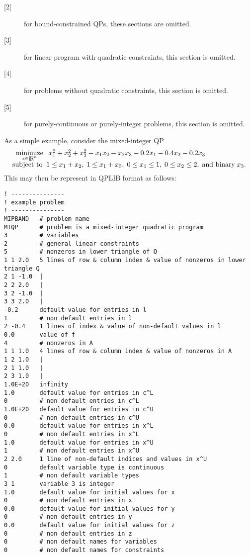 \begin{description}
\item [{[2]}]
for bound-constrained QPs, these sections are omitted.
\item [{[3]}]
for linear program with quadratic constraints, this section is omitted.
\item [{[4]}]
for problems without quadratic constraints, this section is omitted.
\item [{[5]}]
for purely-continuous or purely-integer problems, this section is omitted.
\end{description}

As a simple example, consider the mixed-integer QP
\[\arr{l}{\mininx{} x_1^2 + x_2^2 + x_3^2 - x_1 x_2 - x_2 x_3
  - 0.2 x_1  -0.4 x_2 - 0.2 x_3 \\
\st 1 \leq x_1 + x_2, \; 1 \leq x_1 + x_3, \; 0 \leq x_1 \leq 1,
\; 0 \leq x_2 \leq 2, \; \mbox{and binary} \; x_3.}
\]
This may then be represent in QPLIB format as follows:

{\small
\begin{verbatim}
! ---------------
! example problem
! ---------------
MIPBAND   # problem name
MIQP      # problem is a mixed-integer quadratic program
3         # variables
2         # general linear constraints
5         # nonzeros in lower triangle of Q
1 1 2.0   5 lines of row & column index & value of nonzeros in lower triangle Q
2 1 -1.0  |
2 2 2.0   |
3 2 -1.0  |
3 3 2.0   |
-0.2      default value for entries in l
1         # non default entries in l
2 -0.4    1 lines of index & value of non-default values in l
0.0       value of f
4         # nonzeros in A
1 1 1.0   4 lines of row & column index & value of nonzeros in A
1 2 1.0   |
2 1 1.0   |
2 3 1.0   |
1.0E+20   infinity
1.0       default value for entries in c^L
0         # non default entries in c^L
1.0E+20   default value for entries in c^U
0         # non default entries in c^U
0.0       default value for entries in x^L
0         # non default entries in x^L
1.0       default value for entries in x^U
1         # non default entries in x^U
2 2.0     1 line of non-default indices and values in x^U
0         default variable type is continuous
1         # non default variable types
3 1       variable 3 is integer
1.0       default value for initial values for x
0         # non default entries in x
0.0       default value for initial values for y
0         # non default entries in y
0.0       default value for initial values for z
0         # non default entries in z
0         # non default names for variables
0         # non default names for constraints
\end{verbatim}
}



